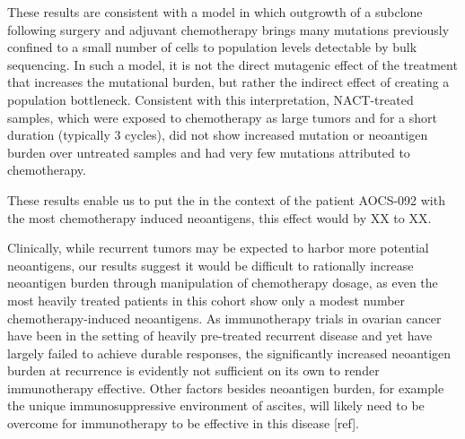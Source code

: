 \documentclass[linenumbers]{bmcart}
\begin{document}
These results are consistent with a model in which outgrowth of a subclone following surgery and adjuvant chemotherapy brings many mutations previously confined to a small number of cells to population levels detectable by bulk sequencing. In such a model, it is not the direct mutagenic effect of the treatment that increases the mutational burden, but rather the indirect effect of creating a population bottleneck. Consistent with this interpretation, NACT-treated samples, which were exposed to chemotherapy as large tumors and for a short duration (typically 3 cycles), did not show increased mutation or neoantigen burden over untreated samples and had very few mutations attributed to chemotherapy.

These results enable us to put the in the context of the patient AOCS-092 with the most chemotherapy induced neoantigens, this effect would by XX to XX.

Clinically, while recurrent tumors may be expected to harbor more potential neoantigens, our results suggest it would be difficult to rationally increase neoantigen burden through manipulation of chemotherapy dosage, as even the most heavily treated patients in this cohort show only a modest number chemotherapy-induced neoantigens. As immunotherapy trials in ovarian cancer have been in the setting of heavily pre-treated recurrent disease and yet have largely failed to achieve durable responses, the significantly increased neoantigen burden at recurrence is evidently not sufficient on its own to render immunotherapy effective. Other factors besides neoantigen burden, for example the unique immunosuppressive environment of ascites, will likely need to be overcome for immunotherapy to be effective in this disease [ref]. 


\end{document}
